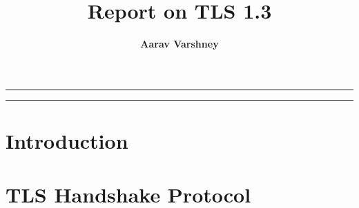\documentclass{article}
\author[1]{\textbf{Aarav Varshney}}
\affil[1]{\textbf{Ashoka University}, \texttt{aarav.varshney@alumni.ashoka.edu.in}}
\title{\textbf{\huge Report on TLS 1.3}\\}
\date{}
\begin{document}
\pagestyle{headings}	
\newpage
\setcounter{page}{1}
\renewcommand{\thepage}{\arabic{page}}

\setlength{\parskip}{0.5em}
	
\maketitle
	
\noindent\rule{15cm}{0.5pt}
	\begin{abstract}
        
	\end{abstract}
\noindent\rule{15cm}{0.4pt}

\section{Introduction}

\section{TLS Handshake Protocol}

% 
% 

\newpage


\end{document}
